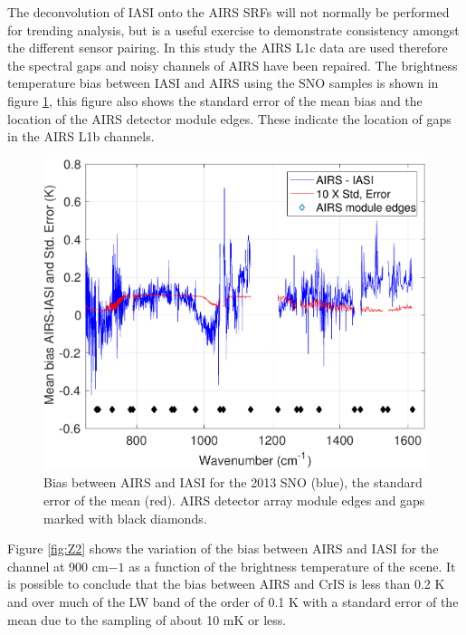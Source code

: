 \documentclass[twocolumn,10pt]{article}
\begin{document}
The deconvolution of IASI onto the AIRS SRFs will not normally be performed for trending analysis, but is a useful exercise to demonstrate consistency amongst the different sensor pairing. In this study the AIRS L1c data are used therefore the spectral gaps and noisy channels of AIRS have been repaired.
The brightness temperature bias between IASI and AIRS using the SNO samples is shown in figure \ref{fig:Z1}, this figure also shows the standard error of the mean bias and the location of the AIRS detector module edges. These indicate the location of gaps in the AIRS L1b channels. 

\begin{figure}[htb]
  \centering   \includegraphics[width=\linewidth]{./figs/2013_ai_l1c_asl_sno_mean_stderr_lw_mw_gaps_markers.pdf}
  \caption{Bias between AIRS and IASI for the 2013 SNO (blue), the standard error of the mean (red). AIRS detector array module edges and gaps marked with black diamonds. }
  \label{fig:Z1}
\end{figure}  

Figure \ref{fig:Z2} shows the variation of the bias between AIRS and IASI for the channel at 900 cm${-1}$ as a function of the brightness temperature of the scene. It is possible to conclude that the bias between AIRS and CrIS is less than 0.2 K and over much of the LW band of the order of 0.1 K with a standard error of the mean due to the sampling of about 10 mK or less.
\end{document}
